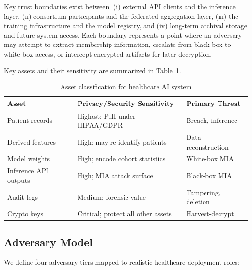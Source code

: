 \documentclass[conference]{IEEEtran}
\begin{document}
	Key trust boundaries exist between: (i) external API clients and the inference layer, (ii) consortium participants and the federated aggregation layer, (iii) the training infrastructure and the model registry, and (iv) long-term archival storage and future system access. Each boundary represents a point where an adversary may attempt to extract membership information, escalate from black-box to white-box access, or intercept encrypted artifacts for later decryption.

	Key assets and their sensitivity are summarized in Table~\ref{tab:assets}.

	\begin{table}[H]
		\centering
		\caption{Asset classification for healthcare AI system}
		\label{tab:assets}
		\scriptsize
		\begin{tabularx}{\linewidth}{>{\raggedright\arraybackslash}p{1.9cm} >{\raggedright\arraybackslash}X >{\raggedright\arraybackslash}p{1.5cm}}
			\toprule
			Asset & Privacy/Security Sensitivity & Primary Threat \\
			\midrule
			Patient records & Highest; PHI under HIPAA/GDPR & Breach, inference \\
			Derived features & High; may re-identify patients & Data reconstruction \\
			Model weights & High; encode cohort statistics & White-box MIA \\
			Inference API outputs & High; MIA attack surface & Black-box MIA \\
			Audit logs & Medium; forensic value & Tampering, deletion \\
			Crypto keys & Critical; protect all other assets & Harvest-decrypt \\
			\bottomrule
		\end{tabularx}
	\end{table}

	\subsection{Adversary Model}
	We define four adversary tiers mapped to realistic healthcare deployment roles:
\end{document}
